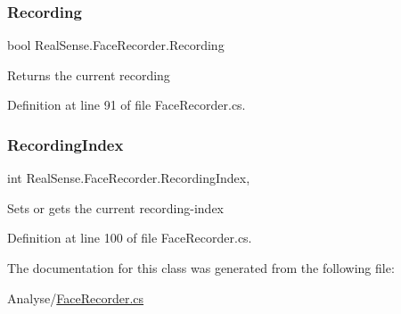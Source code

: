 \subsubsection{\texorpdfstring{Recording}{Recording}}
{\footnotesize\ttfamily bool Real\+Sense.\+Face\+Recorder.\+Recording\hspace{0.3cm}{\ttfamily [get]}}

Returns the current recording 

Definition at line 91 of file Face\+Recorder.\+cs.

\mbox{\label{class_real_sense_1_1_face_recorder_a4f1a094d0321d299feb5aa0e3553b506}} 
\subsubsection{\texorpdfstring{Recording\+Index}{RecordingIndex}}
{\footnotesize\ttfamily int Real\+Sense.\+Face\+Recorder.\+Recording\+Index\hspace{0.3cm}{\ttfamily [get]}, {\ttfamily [set]}}

Sets or gets the current recording-\/index 

Definition at line 100 of file Face\+Recorder.\+cs.



The documentation for this class was generated from the following file\+:\begin{DoxyCompactItemize}
\item 
Analyse/\hyperlink{_face_recorder_8cs}{Face\+Recorder.\+cs}\end{DoxyCompactItemize}
